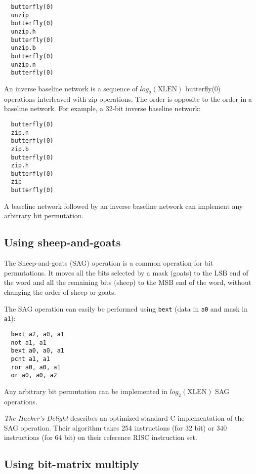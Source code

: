 \begin{verbatim}
  butterfly(0)
  unzip
  butterfly(0)
  unzip.h
  butterfly(0)
  unzip.b
  butterfly(0)
  unzip.n
  butterfly(0)
\end{verbatim}

An inverse baseline network is a sequence of $log_2(\textrm{XLEN})$ butterfly(0)
operations interleaved with zip operations. The order is opposite to the
order in a baseline network. For example, a 32-bit inverse baseline network:

\begin{verbatim}
  butterfly(0)
  zip.n
  butterfly(0)
  zip.b
  butterfly(0)
  zip.h
  butterfly(0)
  zip
  butterfly(0)
\end{verbatim}

A baseline network followed by an inverse baseline network can implement
any arbitrary bit permutation.


\subsection{Using sheep-and-goats}
\label{SAG}

The Sheep-and-goats (SAG) operation is a common operation for bit permutations.
It moves all the bits selected by a mask (goats) to the LSB end of the word
and all the remaining bits (sheep) to the MSB end of the word, without changing
the order of sheep or goats.

The SAG operation can easily be performed using {\tt bext} (data in {\tt a0} and
mask in {\tt a1}):

\begin{verbatim}
  bext a2, a0, a1
  not a1, a1
  bext a0, a0, a1
  pcnt a1, a1
  ror a0, a0, a1
  or a0, a0, a2
\end{verbatim}

Any arbitrary bit permutation can be implemented in $log_2(\textrm{XLEN})$ SAG
operations.

{\it The Hacker's Delight} describes an optimized standard C implementation of
the SAG operation. Their algorithm takes 254 instructions (for 32 bit) or 340
instructions (for 64 bit) on their reference RISC instruction
set.~\cite[p.~152f,~162f]{Seander05}


\subsection{Using bit-matrix multiply}

